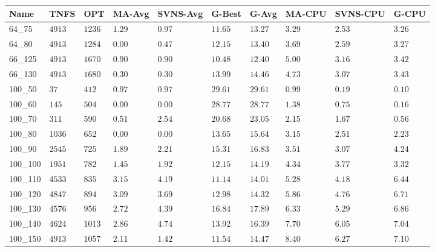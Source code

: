 \begin{center}
    \begin{table}[]
    \centering
    \begin{adjustwidth}{-0.4in}{-1in}
    \begin{tabular}{|lll|l|l|ll|lll|}
\hline
Name     & TNFS        & OPT    & MA-Avg & SVNS-Avg & G-Best & G-Avg & MA-CPU & SVNS-CPU & G-CPU \\
\hline
64\_75   & $4913   $   & $1236$ & $1.29$ & $0.97$   & $11.65$    & $13.27$   & $3.29 $& $2.53$   & $3.26$ \\
64\_80   & $4913   $   & $1284$ & $\bm{0.00}$ & $0.47$   & $12.15$    & $13.40$   & $3.69 $& $2.59$   & $3.27$ \\
\hline
66\_125  & $4913   $   & $1670$ & $0.90$ & $0.90$   & $10.48$    & $12.40$   & $5.00 $& $3.16$   & $3.42$ \\
66\_130  & $4913   $   & $1680$ & $0.30$ & $0.30$   & $13.99$    & $14.46$   & $4.73 $& $3.07$   & $3.43$ \\
\hline
100\_50  & $37     $   & $412 $ & $0.97$ & $0.97$   & $29.61$    & $29.61$   & $0.99 $& $0.19$   & $0.10$ \\
100\_60  & $145    $   & $504 $ & $\bm{0.00}$ & $\bm{0.00}$   & $28.77$    & $28.77$   & $1.38 $& $0.75$   & $0.16$ \\
100\_70  & $311    $   & $590 $ & $0.51$ & $2.54$   & $20.68$    & $23.05$   & $2.15 $& $1.67$   & $0.56$ \\
100\_80  & $1036   $   & $652 $ & $\bm{0.00}$ & $\bm{0.00}$   & $13.65$    & $15.64$   & $3.15 $& $2.51$   & $2.23$ \\
100\_90  & $2545   $   & $725 $ & $1.89$ & $2.21$   & $15.31$    & $16.83$   & $3.51 $& $3.07$   & $4.24$ \\
100\_100 & $1951   $   & $782 $ & $1.45$ & $1.92$   & $12.15$    & $14.19$   & $4.34 $& $3.77$   & $3.32$ \\
100\_110 & $4533   $   & $835 $ & $3.15$ & $4.19$   & $11.14$    & $14.01$   & $5.28 $& $4.18$   & $6.44$ \\
100\_120 & $4847   $   & $894 $ & $3.09$ & $3.69$   & $12.98$    & $14.32$   & $5.86 $& $4.76$   & $6.71$ \\
100\_130 & $4576   $   & $956 $ & $2.72$ & $4.39$   & $16.84$    & $17.89$   & $6.33 $& $5.29$   & $6.86$ \\
100\_140 & $4624   $   & $1013$ & $2.86$ & $4.74$   & $13.92$    & $16.39$   & $7.70 $& $6.05$   & $7.04$ \\
100\_150 & $4913   $   & $1057$ & $2.11$ & $1.42$   & $11.54$    & $14.47$   & $8.40 $& $6.27$   & $7.10$ \\

\end{tabular}
\end{adjustwidth}
\end{table}
\end{center}
